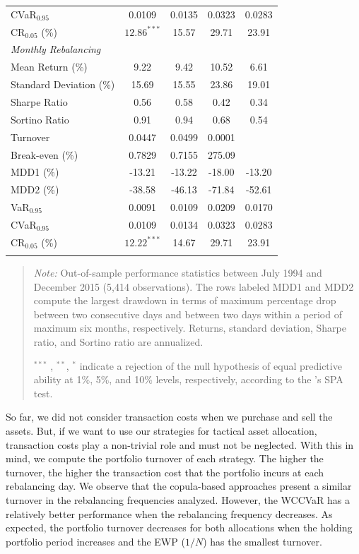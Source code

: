 \documentclass[a4paper,10pt]{article}
\begin{document}
\begin{table}[!ht]
\begin{tabularx}{\textwidth}{@{\extracolsep{\fill}}lcccc@{}}
		CVaR$_{0.95}$ & 0.0109 & 0.0135 & 0.0323 & 0.0283 \\
		CR$_{0.05}$ (\%) & $12.86^{***}$ & 15.57 & 29.71  & 23.91  \\
		\midrule[\heavyrulewidth] \textit{Monthly Rebalancing} &  &  &  &  \\
		\midrule[\heavyrulewidth] Mean Return (\%) & 9.22 & 9.42 & 10.52 & 6.61
		\\
		Standard Deviation (\%) & 15.69 & 15.55 & 23.86 & 19.01 \\
		Sharpe Ratio & 0.56 & 0.58 & 0.42 & 0.34 \\
		Sortino Ratio & 0.91 & 0.94 & 0.68 & 0.54 \\
		Turnover & 0.0447 & 0.0499 & 0.0001 &  \\
		Break-even (\%) &  0.7829 & 0.7155 & 275.09 &  \\
		MDD1 (\%) & -13.21 & -13.22 & -18.00 & -13.20 \\
		MDD2 (\%) & -38.58 & -46.13 & -71.84 & -52.61 \\
		VaR$_{0.95}$ &  0.0091 & 0.0109 & 0.0209  & 0.0170 \\
		CVaR$_{0.95}$ & 0.0109 & 0.0134 & 0.0323 & 0.0283 \\
		CR$_{0.05}$ (\%) & $12.22^{***}$ & 14.67 & 29.71  & 23.91  \\
		\bottomrule &  &  &  &
	\end{tabularx}%
	\begin{quote}
		\textit{Note:} \scriptsize Out-of-sample performance statistics between July 1994 and December 2015 (5,414 observations). The rows labeled MDD1 and MDD2 compute the largest drawdown in terms of maximum percentage drop between two consecutive days and between two days within a period of maximum six months, respectively. Returns, standard deviation, Sharpe ratio, and Sortino ratio are annualized.
		\item \scriptsize $^{\ast\ast\ast}$ , $^{\ast\ast}$, $^{\ast}$ indicate a rejection of the null hypothesis of equal predictive ability at 1\%, 5\%, and 10\% levels, respectively, according to the \citet*{hansen2005test}'s SPA test.
	\end{quote}
	\label{tab:table01}%
\end{table}

So far, we did not consider transaction costs when we purchase and sell the assets. But, if we want to use our strategies for tactical asset allocation, transaction costs play a non-trivial role and must not be neglected. With this in mind, we compute the portfolio turnover of each strategy. The higher the turnover, the higher the transaction cost that the portfolio incurs at each rebalancing day. We observe that the copula-based approaches present a similar turnover in the rebalancing frequencies analyzed. However, the WCCVaR has a relatively better performance when the rebalancing frequency decreases. As expected, the portfolio turnover decreases for both allocations when the holding portfolio period increases and the EWP ($1/N$) has the smallest turnover.
\end{document}
